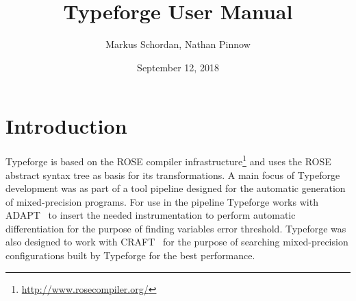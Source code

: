 \documentclass[natbib]{article}
\begin{document}
\title{Typeforge User Manual}

\author{\small Markus Schordan, Nathan Pinnow}
\date{September 12, 2018}

\maketitle

%

\tableofcontents


\section{Introduction}
\label{sec:intro}

Typeforge is based on the ROSE compiler infrastructure\footnote{\url{http://www.rosecompiler.org/}} 
and uses the ROSE abstract syntax tree as basis for its transformations. 
A main focus of Typeforge development was as part of a tool pipeline designed for 
the automatic generation of mixed-precision programs. For use in the pipeline 
Typeforge works with ADAPT~\cite{adapt} to insert the needed instrumentation to 
perform automatic differentiation for the purpose of finding variables error threshold.
Typeforge was also designed to work with CRAFT~\cite{CRAFT2013PARCO,CRAFT2013ICS,CRAFT2016} 
for the purpose of searching mixed-precision configurations built by Typeforge 
for the best performance.
\end{document}

